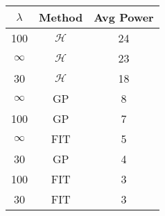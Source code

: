 \centering \begin{tabular}{c|c|c}
$\lambda$	&Method	&Avg Power\\\hline
100	&$\mathcal{H}$	&24\\
$\infty$	&$\mathcal{H}$	&23\\
30	&$\mathcal{H}$	&18\\
$\infty$	&GP	&8\\
100	&GP	&7\\
$\infty$	&FIT	&5\\
30	&GP	&4\\
100	&FIT	&3\\
30	&FIT	&3\\
\end{tabular}
